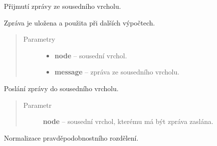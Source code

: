 \begin{fulllineitems}

\begin{fulllineitems}
\label{alex.infer:alex.infer.factor.alex.infer.node.DiscreteVariableNode.message_from}
Přijmutí zprávy ze sousedního vrcholu.

Zpráva je uložena a použita při dalších výpočtech.
\begin{quote}\begin{description}
\item[{Parametry}] \leavevmode\begin{itemize}
\item {} 
\textbf{node} -- sousední vrchol.

\item {} 
\textbf{message} -- zpráva ze sousedního vrcholu.

\end{itemize}

\end{description}\end{quote}

\end{fulllineitems}


\begin{fulllineitems}
\label{alex.infer:alex.infer.factor.alex.infer.node.DiscreteVariableNode.message_to}
Poslání zprávy do sousedního vrcholu.
\begin{quote}\begin{description}
\item[{Parametr}] \leavevmode
\textbf{node} -- sousední vrchol, kterému má být zpráva zaslána.

\end{description}\end{quote}

\end{fulllineitems}


\begin{fulllineitems}
\label{alex.infer:alex.infer.factor.alex.infer.node.DiscreteVariableNode.normalize}
Normalizace pravděpodobnostního rozdělení.


\end{fulllineitems}
\end{fulllineitems}
